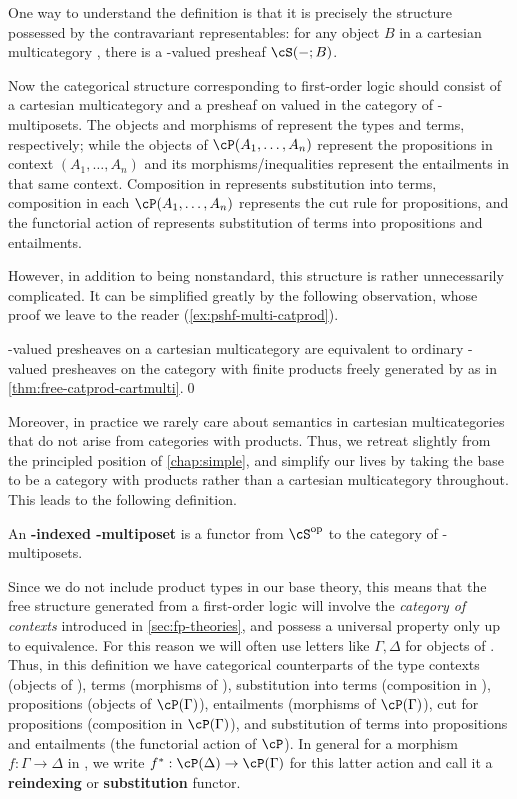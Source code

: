 One way to understand the definition is that it is precisely the structure possessed by the contravariant representables: for any object $B$ in a cartesian multicategory \cS, there is a \bSet-valued presheaf $\cS(-;B)$.

Now the categorical structure corresponding to first-order logic should consist of a cartesian multicategory \bS and a presheaf \cP on \bS valued in the category of \fS-multiposets.
The objects and morphisms of \cS represent the types and terms, respectively; while
the objects of $\cP(A_1,\dots,A_n)$ represent the propositions in context $(A_1,\dots,A_n)$ and its morphisms/inequalities represent the entailments in that same context.
Composition in \cS represents substitution into terms, composition in each $\cP(A_1,\dots,A_n)$ represents the cut rule for propositions, and the functorial action of \cP represents substitution of terms into propositions and entailments.

However, in addition to being nonstandard, this structure is rather unnecessarily complicated.
It can be simplified greatly by the following observation, whose proof we leave to the reader (\cref{ex:pshf-multi-catprod}).

\begin{lem}\label{thm:pshf-multi-catprod}
  \bC-valued presheaves on a cartesian multicategory \cS are equivalent to ordinary \bC-valued presheaves on the category with finite products freely generated by \cS as in \cref{thm:free-catprod-cartmulti}.\qed
\end{lem}

Moreover, in practice we rarely care about semantics in cartesian multicategories that do not arise from categories with products.
Thus, we retreat slightly from the principled position of \cref{chap:simple}, and simplify our lives by taking the base \cS to be a category with products rather than a cartesian multicategory throughout.
This leads to the following definition.

\begin{defn}
  An \textbf{\cS-indexed \fS-multiposet} is a functor \cP from $\cS\op$ to the category of \fS-multiposets.
\end{defn}

Since we do not include product types in our base theory, this means that the free structure generated from a first-order logic will involve the \emph{category of contexts} introduced in \cref{sec:fp-theories}, and possess a universal property only up to equivalence.
For this reason we will often use letters like $\Gamma,\Delta$ for objects of \cS.
Thus, in this definition we have categorical counterparts of the type contexts (objects of \cS), terms (morphisms of \cS), substitution into terms (composition in \cS), propositions (objects of $\cP(\Gamma)$), entailments (morphisms of $\cP(\Gamma)$), cut for propositions (composition in $\cP(\Gamma)$), and substitution of terms into propositions and entailments (the functorial action of $\cP$).
In general for a morphism $f:\Gamma\to\Delta$ in \cS, we write $f^* : \cP(\Delta) \to \cP(\Gamma)$ for this latter action and call it a \textbf{reindexing} or \textbf{substitution} functor.


